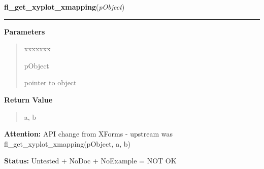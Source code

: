 \hspace{.8\funcindent}\begin{boxedminipage}{\funcwidth}

    \raggedright \textbf{fl\_get\_xyplot\_xmapping}(\textit{pObject})

    \vspace{-1.5ex}

    \rule{\textwidth}{0.5\fboxrule}
\setlength{\parskip}{2ex}
\setlength{\parskip}{1ex}
      \textbf{Parameters}
      \vspace{-1ex}

      \begin{quote}
        \begin{Ventry}{xxxxxxx}

          \item[pObject]

          pointer to object

        \end{Ventry}

      \end{quote}

      \textbf{Return Value}
    \vspace{-1ex}

      \begin{quote}
      a, b

      \end{quote}

\textbf{Attention:} API change from XForms - upstream was fl\_get\_xyplot\_xmapping(pObject, a,
b)



\textbf{Status:} Untested + NoDoc + NoExample = NOT OK



    \end{boxedminipage}

    \label{xformslib:library:fl_get_xyplot_ymapping}

    \vspace{0.5ex}

